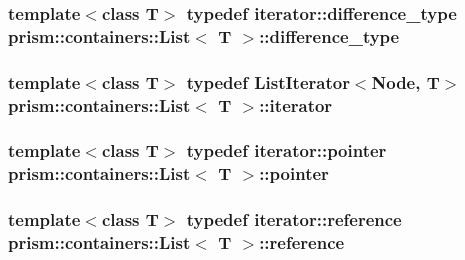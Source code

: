 \subsubsection[{\texorpdfstring{difference\+\_\+type}{difference_type}}]{\setlength{\rightskip}{0pt plus 5cm}template$<$class T$>$ typedef iterator\+::difference\+\_\+type {\bf prism\+::containers\+::\+List}$<$ T $>$\+::{\bf difference\+\_\+type}}\hypertarget{classprism_1_1containers_1_1_list_a27674a278c68d3f0242fc13b87cdf0f0}{}\label{classprism_1_1containers_1_1_list_a27674a278c68d3f0242fc13b87cdf0f0}
\subsubsection[{\texorpdfstring{iterator}{iterator}}]{\setlength{\rightskip}{0pt plus 5cm}template$<$class T$>$ typedef List\+Iterator$<$Node, T$>$ {\bf prism\+::containers\+::\+List}$<$ T $>$\+::{\bf iterator}}\hypertarget{classprism_1_1containers_1_1_list_af3a4f72e9b96d080fe64d1803c91c7f8}{}\label{classprism_1_1containers_1_1_list_af3a4f72e9b96d080fe64d1803c91c7f8}
\subsubsection[{\texorpdfstring{pointer}{pointer}}]{\setlength{\rightskip}{0pt plus 5cm}template$<$class T$>$ typedef iterator\+::pointer {\bf prism\+::containers\+::\+List}$<$ T $>$\+::{\bf pointer}}\hypertarget{classprism_1_1containers_1_1_list_a93454816d3759016ad6736a21fc1892c}{}\label{classprism_1_1containers_1_1_list_a93454816d3759016ad6736a21fc1892c}
\subsubsection[{\texorpdfstring{reference}{reference}}]{\setlength{\rightskip}{0pt plus 5cm}template$<$class T$>$ typedef iterator\+::reference {\bf prism\+::containers\+::\+List}$<$ T $>$\+::{\bf reference}}\hypertarget{classprism_1_1containers_1_1_list_ae7c9f99dba5936d744397455c97aacde}{}\label{classprism_1_1containers_1_1_list_ae7c9f99dba5936d744397455c97aacde}
